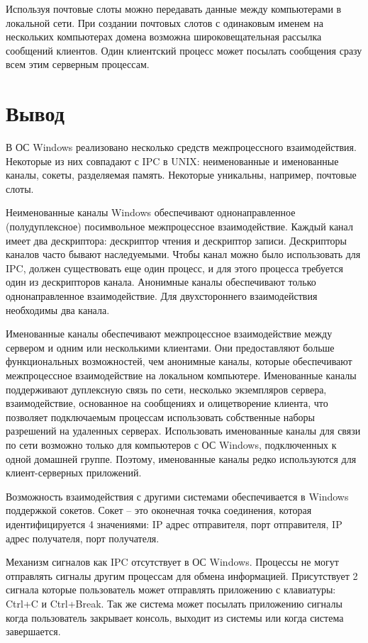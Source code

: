 \documentclass[a4paper]{article}
\begin{document}
	Используя почтовые слоты можно передавать данные между компьютерами в локальной сети. При создании почтовых слотов с одинаковым именем на нескольких компьютерах домена возможна широковещательная рассылка сообщений клиентов. Один клиентский процесс может посылать сообщения сразу всем этим серверным процессам.

\section{Вывод}
	В ОС Windows реализовано несколько средств межпроцессного взаимодействия. Некоторые из них совпадают с IPC в UNIX: неименованные и именованные каналы, сокеты, разделяемая память. Некоторые уникальны, например, почтовые слоты.
	
	Неименованные каналы Windows обеспечивают однонаправленное (полудуплексное) посимвольное межпроцессное взаимодействие. Каждый канал имеет два дескриптора: дескриптор чтения и дескриптор записи. Дескрипторы каналов часто бывают наследуемыми. Чтобы канал можно было использовать для IPC, должен существовать еще один процесс, и для этого процесса требуется один из дескрипторов канала. 
Анонимные каналы обеспечивают только однонаправленное взаимодействие. Для двухстороннего взаимодействия необходимы два канала. 

	Именованные каналы обеспечивают межпроцессное взаимодействие между сервером и одним или несколькими клиентами. Они предоставляют больше функциональных возможностей, чем анонимные каналы, которые обеспечивают межпроцессное взаимодействие на локальном компьютере. Именованные каналы поддерживают дуплексную связь по сети, несколько экземпляров сервера, взаимодействие, основанное на сообщениях и олицетворение клиента, что позволяет подключаемым процессам использовать собственные наборы разрешений на удаленных серверах. Использовать именованные каналы для связи по сети возможно только для компьютеров с ОС Windows, подключенных к одной домашней группе. Поэтому, именованные каналы редко используются для клиент-серверных приложений.
	
	Возможность взаимодействия с другими системами обеспечивается в Windows поддержкой сокетов. Сокет – это оконечная точка соединения, которая идентифицируется 4 значениями: IP адрес отправителя, порт отправителя, IP адрес получателя, порт получателя. 
	
	Механизм сигналов как IPC отсутствует в ОС Windows. Процессы не могут отправлять сигналы другим процессам для обмена информацией. Присутствует 2 сигнала которые пользователь может отправлять приложению с клавиатуры: Ctrl+C и Ctrl+Break. Так же система может посылать приложению сигналы когда пользователь закрывает консоль, выходит из системы или когда система завершается.
	
\end{document}
